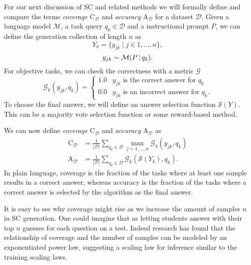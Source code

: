 For our next discussion of SC and related methods we will formally define and compare the 
terms \textit{coverage} $\mathrm{C}_{\mathcal{D}}$ and \textit{accuracy} $\mathrm{A}_{\mathcal{D}}$ for a dataset ${\mathcal{D}}$.
Given a language model $\mathcal{M}$, a task query $q_k \in {\mathcal{D}}$ and a instructional prompt $P$, we can define the generation collection of length $n$ as
\begin{equation}
    Y_k = \{y_{jk}\mid j \in 1, ..., n\},
\end{equation}
\begin{equation}
    y_{jk} \sim \mathcal{M}(P \, \vert \, q_k).
\end{equation}
For objective tasks, we can check the correctness with a metric $\mathcal{G}$
\begin{equation}
    \mathcal{G}_{k}(y_{jk}, q_k) = 
    \begin{cases}
        1.0 & y_{jk} \text{ is the correct answer for } q_k\\
        0.0 & y_{jk} \text{ is an incorrect answer for } q_k.
    \end{cases}
\end{equation}
To choose the final answer, we will define an answer selection function $\mathcal{S}(Y)$. 
This can be a majority vote selection function or some reward-based method.

We can now define \textit{coverage} $\mathrm{C}_{\mathcal{D}}$ and \textit{accuracy} $\mathrm{A}_{\mathcal{D}}$ as
\begin{align}
    \mathrm{C}_{\mathcal{D}} &= \frac{1}{|\mathcal{D}|} \sum_{q_k \in \mathcal{D}} \max_{j=1,...,n} \mathcal{G}_k(y_{jk}, q_k) \\
    \mathrm{A}_{\mathcal{D}} &= \frac{1}{|\mathcal{D}|} \sum_{q_k \in \mathcal{D}} \mathcal{G}_k\left( \mathcal{S}(Y_k), q_k \right).
\end{align}
In plain language, coverage is the fraction of the tasks where at least one sample results in a correct answer,
whereas accuracy is the fraction of the tasks where a correct answer is selected by the algorithm as the final answer.

It is easy to see why coverage might rise as we increase the amount of samples $n$ in SC generation.
One could imagine that as letting students answer with their top $n$ guesses for each question on a test. 
Indeed research\cite{brown2024largelanguagemonkeysscaling} has found that the relationship of coverage and the 
number of samples can be modeled by an exponentiated power law, suggesting a scaling law for inference
similar to the training scaling laws\cite{kaplan2020scalinglawsneurallanguage}.

